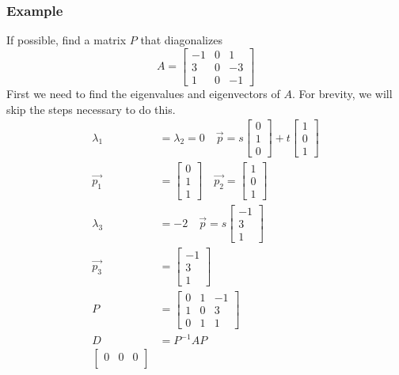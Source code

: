 \documentclass{math}
\begin{document}
\subsubsection*{Example}
If possible, find a matrix \( P \) that diagonalizes
\[ A = \begin{bmatrix}
  -1 & 0 & 1 \\
  3 & 0 & -3 \\
  1 & 0 & -1
\end{bmatrix} \]
First we need to find the eigenvalues and eigenvectors of \( A \). For brevity,
we will skip the steps necessary to do this.
\begin{align*}
  \lambda_1 &= \lambda_2 = 0 \quad
  \vec{p} = s\begin{bmatrix}0 \\ 1 \\ 0\end{bmatrix}+
    t\begin{bmatrix}1 \\ 0 \\ 1\end{bmatrix} \\
  \vec{p_1} &= \begin{bmatrix}0 \\ 1 \\ 1\end{bmatrix} \quad
  \vec{p_2} = \begin{bmatrix}1 \\ 0 \\ 1\end{bmatrix} \\
  \lambda_3 &= -2 \quad
  \vec{p} = s\begin{bmatrix}-1 \\ 3 \\ 1\end{bmatrix} \\
  \vec{p_3} &= \begin{bmatrix}-1 \\ 3 \\ 1\end{bmatrix} \\
  P &= \begin{bmatrix}
    0 & 1 & -1 \\
    1 & 0 & 3 \\
    0 & 1 & 1
  \end{bmatrix} \\
  D &= P^{-1}AP \\
  \begin{bmatrix}
    0 & 0 & 0 \\

\end{bmatrix}
\end{align*}
\end{document}
